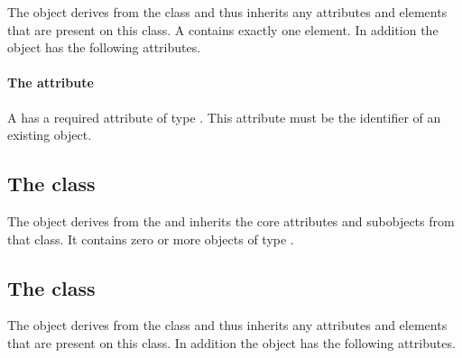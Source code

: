 
The \SampledFieldGeometry object derives from the \GeometryDefinition
class and thus inherits any attributes and elements that are present on
this class.
A \SampledFieldGeometry contains exactly one \ListOfSampledVolumes
element.
In addition the \SampledFieldGeometry object has the following
attributes.

\paragraph{The \fixttspace{} attribute}

A \SampledFieldGeometry has a required attribute  of
type .
This attribute must be the identifier of an existing \SampledField
object.


\subsection{The  class}
\label{listofsampledfields-class}


The \ListOfSampledFields object derives from the  and
inherits the core attributes and subobjects from that class. It contains
zero or more objects of type \SampledField.

\subsection{The  class}
\label{sampledfield-class}




The \SampledField object derives from the \SBase class and thus inherits
any attributes and elements that are present on this class.
In addition the \SampledField object has the following attributes.

